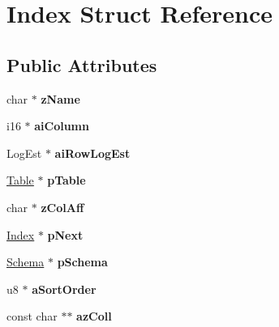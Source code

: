 \hypertarget{struct_index}{}\section{Index Struct Reference}
\label{struct_index}
\subsection*{Public Attributes}
\begin{DoxyCompactItemize}
\item 
\mbox{\label{struct_index_a8848cddf6e09f22e3b794ec019082ced}} 
char $\ast$ {\bfseries z\+Name}
\item 
\mbox{\label{struct_index_a62b5bf88f7c567f15e9a8c9da579d45c}} 
i16 $\ast$ {\bfseries ai\+Column}
\item 
\mbox{\label{struct_index_a830ea536e93022501262afe908bdd35c}} 
Log\+Est $\ast$ {\bfseries ai\+Row\+Log\+Est}
\item 
\mbox{\label{struct_index_a01c6d4da27cba325ca58f333f87a6f44}} 
\mbox{\hyperlink{struct_table}{Table}} $\ast$ {\bfseries p\+Table}
\item 
\mbox{\label{struct_index_af076df9f74dd836001c0a59d27274c0e}} 
char $\ast$ {\bfseries z\+Col\+Aff}
\item 
\mbox{\label{struct_index_a115a17d236bd277d59dd5ea030954c3e}} 
\mbox{\hyperlink{struct_index}{Index}} $\ast$ {\bfseries p\+Next}
\item 
\mbox{\label{struct_index_af14f5ddd57eab2aba63dcb5db2aa92af}} 
\mbox{\hyperlink{struct_schema}{Schema}} $\ast$ {\bfseries p\+Schema}
\item 
\mbox{\label{struct_index_a0a3fc87b53193995f59c9657443e9a99}} 
u8 $\ast$ {\bfseries a\+Sort\+Order}
\item 
\mbox{\label{struct_index_a04f01be3e98aabc4a0516a2fbf28fae1}} 
const char $\ast$$\ast$ {\bfseries az\+Coll}
\item 
\mbox{\label{struct_index_a92dd15cc702e261dc2face5a27820e07}} 
$$
\end{DoxyCompactItemize}
